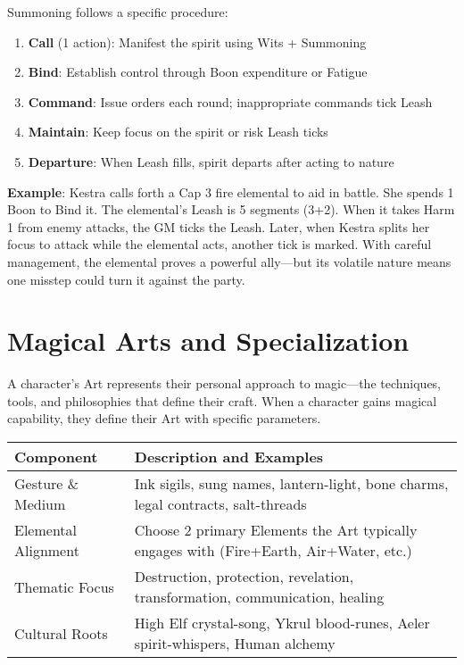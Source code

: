 Summoning follows a specific procedure:
\begin{enumerate}
    \item \textbf{Call} (1 action): Manifest the spirit using Wits + Summoning
    \item \textbf{Bind}: Establish control through Boon expenditure or Fatigue
    \item \textbf{Command}: Issue orders each round; inappropriate commands tick Leash
    \item \textbf{Maintain}: Keep focus on the spirit or risk Leash ticks
    \item \textbf{Departure}: When Leash fills, spirit departs after acting to nature
\end{enumerate}

\textbf{Example}: Kestra calls forth a Cap 3 fire elemental to aid in battle. She spends 1 Boon to Bind it. The elemental's Leash is 5 segments (3+2). When it takes Harm 1 from enemy attacks, the GM ticks the Leash. Later, when Kestra splits her focus to attack while the elemental acts, another tick is marked. With careful management, the elemental proves a powerful ally—but its volatile nature means one misstep could turn it against the party.

\section*{Magical Arts and Specialization}

A character's Art represents their personal approach to magic—the techniques, tools, and philosophies that define their craft. When a character gains magical capability, they define their Art with specific parameters.

\begin{fatebox}
\begin{tabularx}{\textwidth}{lX}
\toprule
\textbf{Component} & \textbf{Description and Examples} \\
\midrule
Gesture \& Medium & Ink sigils, sung names, lantern-light, bone charms, legal contracts, salt-threads \\
Elemental Alignment & Choose 2 primary Elements the Art typically engages with (Fire+Earth, Air+Water, etc.) \\
Thematic Focus & Destruction, protection, revelation, transformation, communication, healing \\
Cultural Roots & High Elf crystal-song, Ykrul blood-runes, Aeler spirit-whispers, Human alchemy \\
\bottomrule
\end{tabularx}
\end{fatebox}

